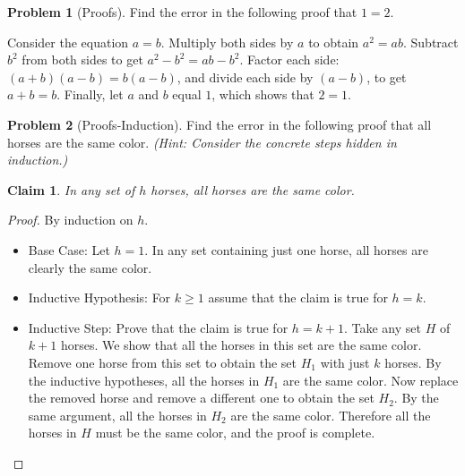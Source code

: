 \documentclass[10pt]{article}
\newtheorem{claim}{Claim}
\theoremstyle{definition}
\newtheorem{problem}{Problem}
\newcommand{\solution}[1]{
  \begin{tcolorbox}[breakable,title=Solution \arabic{problem}:,title after break={Solution \arabic{problem}, continued},colframe=black,colback=white,colbacktitle=white,coltitle=black,fonttitle=\bfseries,titlerule=0mm,arc=0mm,lefttitle=-1pt]
    #1
  \end{tcolorbox}
}
\begin{document}


\begin{problem}[Proofs]
Find the error in the following proof that $1=2$.  

Consider the equation $a=b$.  Multiply both sides by $a$ to obtain $a^2 = ab$.  Subtract $b^2$ from both sides to get $a^2-b^2 = ab-b^2$.  Factor each side: $(a+b)(a-b) = b(a-b)$, and divide each side by $(a-b)$, to get $a+b = b$.  Finally, let $a$ and $b$ equal $1$, which shows that $2 = 1$.
\end{problem}



\begin{problem}[Proofs-Induction]
Find the error in the following proof that all horses are the same color. {\em (Hint: Consider the concrete steps hidden in induction.)}

\begin{claim} In any set of $h$ horses, all horses are the same color.\end{claim}
\begin{proof}
By induction on $h$.
\begin{itemize}
\item Base Case: Let $h = 1$. In any set containing just one horse, all horses are clearly the same color.
\item Inductive Hypothesis: For $k\geq 1$ assume that the claim is true for $h = k$.
\item Inductive Step: Prove that the claim is true for $h = k+1$.  Take any set $H$ of $k+1$ horses.  We show that all the horses in this set are the same color. Remove one horse from this set to obtain the set $H_1$ with just $k$ horses.  By the inductive hypotheses, all the horses in $H_1$ are the same color.  Now replace the removed horse and remove a different one to obtain the set $H_2$.  By the same argument, all the horses in $H_2$ are the same color.  Therefore all the horses in $H$ must be the same color, and the proof is complete.
\end{itemize}
\end{proof}
\end{problem}

\end{document}
